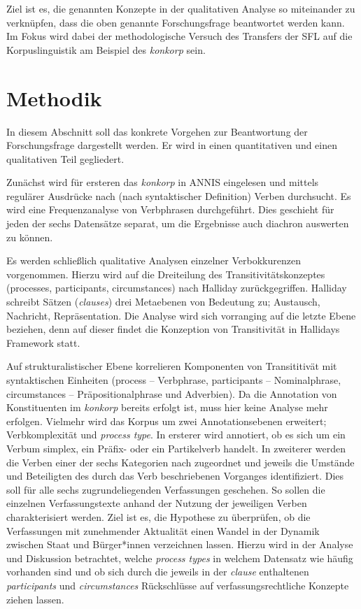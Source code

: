 \noindent Ziel ist es, die genannten Konzepte in der qualitativen Analyse so miteinander zu verknüpfen, dass die oben genannte Forschungsfrage beantwortet werden kann. Im Fokus wird dabei der methodologische Versuch des Transfers der SFL auf die Korpuslinguistik am Beispiel des \textit{konkorp} sein.

\section{Methodik}

In diesem Abschnitt soll das konkrete Vorgehen zur Beantwortung der Forschungsfrage dargestellt werden. Er wird in einen quantitativen und einen qualitativen Teil gegliedert.

Zunächst wird für ersteren das \textit{konkorp} in ANNIS eingelesen und mittels regulärer Ausdrücke nach (nach syntaktischer Definition) Verben durchsucht. Es wird eine Frequenzanalyse von Verbphrasen durchgeführt. Dies geschieht für jeden der sechs Datensätze separat, um die Ergebnisse auch diachron auswerten zu können.

Es werden schließlich qualitative Analysen einzelner Verbokkurenzen vorgenommen. Hierzu wird auf die Dreiteilung des Transitivitätskonzeptes (processes, participants, circumstances) nach Halliday zurückgegriffen.
Halliday schreibt Sätzen (\textit{clauses}) drei Metaebenen von Bedeutung zu; Austausch, Nachricht, Repräsentation. Die Analyse wird sich vorranging auf die letzte Ebene beziehen, denn auf dieser findet die Konzeption von Transitivität in Hallidays Framework statt.

Auf strukturalistischer Ebene korrelieren Komponenten von Transititivät mit syntaktischen Einheiten (process -- Verbphrase, participants -- Nominalphrase, circumstances -- Präpositionalphrase und Adverbien). Da die Annotation von Konstituenten im \textit{konkorp} bereits erfolgt ist, muss hier keine Analyse mehr erfolgen.
Vielmehr wird das Korpus um zwei Annotationsebenen erweitert; Verbkomplexität und \textit{process type}. In ersterer wird annotiert, ob es sich um ein Verbum simplex, ein Präfix- oder ein Partikelverb handelt. In zweiterer werden die Verben einer der sechs Kategorien nach \citet[171]{Halliday2004} zugeordnet und jeweils die Umstände und Beteiligten des durch das Verb beschriebenen Vorganges identifiziert. Dies soll für alle sechs zugrundeliegenden Verfassungen geschehen. So sollen die einzelnen Verfassungstexte anhand der Nutzung der jeweiligen Verben charakterisiert werden. Ziel ist es, die Hypothese zu überprüfen, ob die Verfassungen mit zunehmender Aktualität einen Wandel in der Dynamik zwischen Staat und Bürger*innen verzeichnen lassen. Hierzu wird in der Analyse und Diskussion betrachtet, welche \textit{process types} in welchem Datensatz wie häufig vorhanden sind und ob sich durch die jeweils in der \textit{clause} enthaltenen \textit{participants} und \textit{circumstances} Rückschlüsse auf verfassungsrechtliche Konzepte ziehen lassen.

